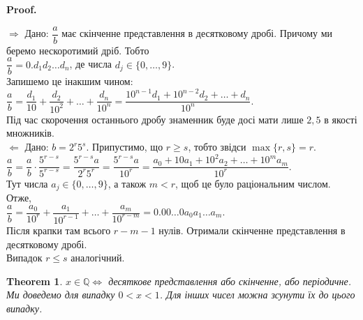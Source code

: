 \documentclass[a4paper, 10pt]{article}
\makeatletter
\theoremstyle{theoremdd}
\newtheorem{theorem}{Theorem}[subsection]
\theoremstyle{theoremdd}
\theoremstyle{theoremdd}
\theoremstyle{theoremdd}
\theoremstyle{theoremdd}
\theoremstyle{theoremdd}
\theoremstyle{theoremdd}
\theoremstyle{theoremdd}
\def\rightproof{$\boxed{\Rightarrow}$ }
\def\leftproof{$\boxed{\Leftarrow}$ }
\renewenvironment{proof}[1][Proof.\\]{\par
\pushQED{\hfill \qed}%
\normalfont \topsep6\p@\@plus6\p@\relax
\trivlist
\item\relax
{\bfseries
#1\@addpunct{.}}\hspace\labelsep\ignorespaces
}{%
\popQED\endtrivlist\@endpefalse
}
\makeatother
\begin{document}
\begin{proof}
\rightproof Дано: $\dfrac{a}{b}$ має скінченне представлення в десятковому дробі. Причому ми беремо нескоротимий дріб. Тобто\\
$\dfrac{a}{b} = 0.d_1d_2\dots d_n$, де числа $d_j \in \{0,\dots,9\}$.\\
Запишемо це інакшим чином:\\
$\dfrac{a}{b} = \dfrac{d_1}{10} + \dfrac{d_2}{10^2} + \dots + \dfrac{d_n}{10^n} = \dfrac{10^{n-1}d_1 + 10^{n-2}d_2 + \dots + d_n}{10^n}$.\\
Під час скорочення останнього дробу знаменник буде досі мати лише $2,5$ в якості множників.
\bigskip \\
\leftproof Дано: $b = 2^r 5^s$. Припустимо, що $r \geq s$, тобто звідси $\max \{r,s\} = r$.\\
$\dfrac{a}{b} = \dfrac{a}{b} \cdot \dfrac{5^{r-s}}{5^{r-s}} = \dfrac{5^{r-s}a}{2^r 5^r} = \dfrac{5^{r-s}a}{10^r} = \dfrac{a_0+10a_1+10^2a_2+\dots+10^ma_m}{10^r}$.\\
Тут числа $a_j \in \{0,\dots,9\}$, а також $m < r$, щоб це було раціональним числом. Отже,\\
$\dfrac{a}{b} = \dfrac{a_0}{10^r} + \dfrac{a_1}{10^{r-1}} + \dots + \dfrac{a_m}{10^{r-m}} = 0.00\dots 0a_0a_1\dots a_m$.\\
Після крапки там всього $r-m-1$ нулів. Отримали скінченне представлення в десятковому дробі.\\
Випадок $r \leq s$ аналогічний.
\end{proof}

\begin{theorem}
$x \in \mathbb{Q} \iff$ десяткове представлення або скінченне, або періодичне.\\
\textit{Ми доведемо для випадку $0 < x < 1$. Для інших чисел можна зсунути їх до цього випадку.}
\end{theorem}
\end{document}
